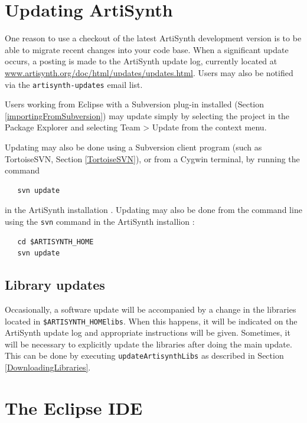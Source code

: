 \section{Updating ArtiSynth}
\label{UpdatingArtiSynth}

One reason to use a checkout of the latest ArtiSynth
development version is to be able to migrate recent changes into your
code base. When a significant update occurs, a posting is made to the
ArtiSynth update log, currently located at
\href{http://www.artisynth.org/doc/html/updates/updates.html}
{www.artisynth.org/doc/html/updates/updates.html}.
Users may also be notified via the {\tt artisynth-updates} email list.

Users working from Eclipse with a Subversion plug-in installed
(Section \ref{importingFromSubversion}) may update simply by selecting
the project in the {\sf Package Explorer} and selecting {\sf Team >
Update} from the context menu.

\ifWindows
Updating may also be done using a Subversion client program
(such as TortoiseSVN, Section \ref{TortoiseSVN}), or
from a Cygwin terminal, by running the command
\begin{verbatim}
   svn update 
\end{verbatim}
in the ArtiSynth installation \directory.
\else
Updating may also be done from the command line using the {\tt svn}
command in the ArtiSynth installion \directory:
\begin{verbatim}
   cd $ARTISYNTH_HOME
   svn update 
\end{verbatim}
\fi

\subsection{Library updates}

Occasionally, a software update will be accompanied by a change in the
libraries located in {\tt \$ARTISYNTH\_HOME\SEP libs}.  When this
happens, it will be indicated on the ArtiSynth update log and
appropriate instructions will be given. Sometimes, it will be
necessary to explicitly update the libraries after doing the main
update. This can be done by executing {\tt updateArtisynthLibs} as
described in Section \ref{DownloadingLibraries}.

\section{The Eclipse IDE}
\label{EclipseIDE}


